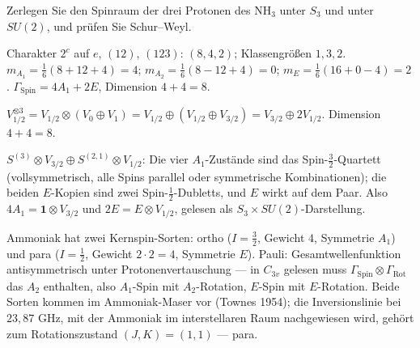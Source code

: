 \begin{aufgabe}
Zerlegen Sie den Spinraum der drei Protonen des $\mathrm{NH_3}$ unter $S_3$ und unter $SU(2)$, und prüfen Sie Schur--Weyl.

\loesung
{}
Charakter $2^{c}$ auf $e$, $(12)$, $(123)$: $(8, 4, 2)$; Klassengrößen $1, 3, 2$. $m_{A_1} = \frac16(8 + 12 + 4) = 4$; $m_{A_2} = \frac16(8 - 12 + 4) = 0$; $m_E = \frac16(16 + 0 - 4) = 2$. $\Gamma_{\mathrm{Spin}} = 4A_1 + 2E$, Dimension $4 + 4 = 8$. \checkmark

$V_{1/2}^{\otimes3} = V_{1/2}\otimes(V_0\oplus V_1) = V_{1/2}\oplus(V_{1/2}\oplus V_{3/2}) = V_{3/2}\oplus2V_{1/2}$. Dimension $4 + 4 = 8$. \checkmark

$S^{(3)}\otimes V_{3/2}\oplus S^{(2,1)}\otimes V_{1/2}$: Die vier $A_1$-Zustände sind das Spin-$\frac32$-Quartett (vollsymmetrisch, alle Spins parallel oder symmetrische Kombinationen); die beiden $E$-Kopien sind zwei Spin-$\frac12$-Dubletts, und $E$ wirkt auf dem Paar. Also $4A_1 = \mathbf 1\otimes V_{3/2}$ und $2E = E\otimes V_{1/2}$, gelesen als $S_3\times SU(2)$-Darstellung. \checkmark

Ammoniak hat zwei Kernspin-Sorten: ortho ($I = \frac32$, Gewicht $4$, Symmetrie $A_1$) und para ($I = \frac12$, Gewicht $2\cdot2 = 4$, Symmetrie $E$). Pauli: Gesamtwellenfunktion antisymmetrisch unter Protonenvertauschung --- in $C_{3v}$ gelesen muss $\Gamma_{\mathrm{Spin}}\otimes\Gamma_{\mathrm{Rot}}$ das $A_2$ enthalten, also $A_1$-Spin mit $A_2$-Rotation, $E$-Spin mit $E$-Rotation. Beide Sorten kommen im Ammoniak-Maser vor (Townes 1954); die Inversionslinie bei $23{,}87$ GHz, mit der Ammoniak im interstellaren Raum nachgewiesen wird, gehört zum Rotationszustand $(J, K) = (1, 1)$ --- para.

\begin{center}
\begin{minipage}{0.88\textwidth}
\end{minipage}
\end{center}
\end{aufgabe}

